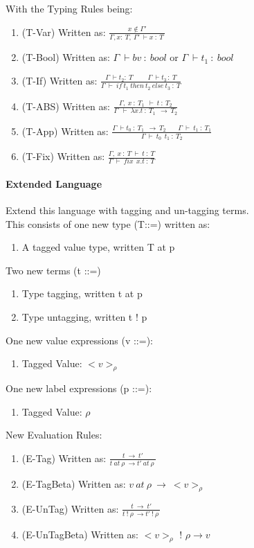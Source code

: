 \documentclass{article}
\begin{document}
With the Typing Rules being:
\begin{enumerate}
\item (T-Var) Written as: $\frac{x\notin \Gamma '}{\Gamma ,x:\:T,\:\Gamma '\:\vdash x\::\:T\:}$
\item (T-Bool) Written as: $\Gamma \:\vdash bv\: : \:bool$ or $\Gamma \:\vdash t_1\: : \:bool$
\item (T-If) Written as: $\frac{\Gamma \:\vdash t_2:\:T\:\:\:\:\:\:\:\:\:\:\Gamma \:\vdash t_{3\:}:\:T}{\Gamma \:\vdash \:if\:t_1\:then\:t_2\:else\:t_3\::\:T}$
\item (T-ABS) Written as: $\frac{\Gamma ,\:x\::\:T_1\:\:\vdash \:t\::\:T_2}{\Gamma \:\:\vdash \:\lambda x.t\::\:T_1\:\:\rightarrow \:T_2}$
\item (T-App) Written as: $\frac{\Gamma \:\vdash t_0\::\:T_1\:\:\rightarrow \:T_2\:\:\:\:\:\:\:\:\Gamma \:\vdash \:t_1\::\:T_1}{\Gamma \:\vdash \:t_0\:\:t_1\::\:T_2}$
\item (T-Fix) Written as: $\frac{\Gamma ,\:x\::\:T\:\vdash \:t\::\:T}{\Gamma \:\vdash \:fix\:\:x.t\::\:T}$
\end{enumerate}

\paragraph{Extended Language}

Extend this language with tagging and un-tagging terms.
\\This consists of one new type (T::=) written as:
\begin{enumerate}
\item A tagged value type, written T at p
\end{enumerate}
Two new terms (t ::=)
\begin{enumerate}
\item Type tagging, written t at p
\item Type untagging, written t ! p
\end{enumerate}
One new value expressions (v ::=):
\begin{enumerate}
\item Tagged Value: $<v>_{\rho }$
\end{enumerate}
One new label expressions (p ::=):
\begin{enumerate}
\item Tagged Value: $\rho$
\end{enumerate}
New Evaluation Rules:
\begin{enumerate}
\item (E-Tag) Written as: $\frac{t\:\rightarrow \:t'}{t\:at\:\rho \:\rightarrow t'\:at\:\rho \:}$  
\item (E-TagBeta) Written as: $v\:at\:\rho \:\rightarrow \:<v>_{\rho }$
\item (E-UnTag) Written as: $\frac{t\:\rightarrow \:t'}{t\:!\:\rho \:\rightarrow t'\:!\:\rho \:}$
\item (E-UnTagBeta) Written as: $<v>_\rho$ ! $\rho \rightarrow v$
\end{enumerate}
\end{document}
